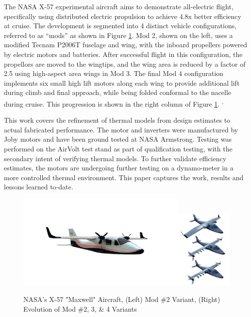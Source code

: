\documentclass[]{aiaa-tc}%
\begin{document}
The NASA X-57 experimental aircraft aims to demonstrate all-electric flight, specifically using distributed electric propulsion to achieve 4.8x better efficiency at cruise. The development is segmented into 4 distinct vehicle configurations, referred to as ``mods'' as shown in Figure \ref{fig:Mod2Big}. Mod 2, shown on the left, uses a modified Tecnam P2006T fuselage and wing, with the inboard propellers powered by electric motors and batteries. After successful flight in this configuration, the propellors are moved to the wingtips, and the wing area is reduced by a factor of 2.5 using high-aspect area wings in Mod 3. The final Mod 4 configuration implements six small high lift motors along each wing to provide additional lift during climb and final approach, while being folded conformal to the nacelle during cruise. This progression is shown in the right column of Figure \ref{fig:Mod2Big}. \cite{falck_X57}\textsuperscript{,}\cite{Borer_2016}

This work covers the refinement of thermal models from design estimates to actual fabricated performance. The motor and inverters were manufactured by Joby motors and have been ground tested at NASA Armstrong. Testing was performed on the AirVolt test stand as part of qualification testing, with the secondary intent of verifying thermal models. To further validate efficiency estimates, the motors are undergoing further testing on a dynamo-meter in a more controlled thermal environment. This paper captures the work, results and lessons learned to-date.

\begin{figure}[!htb]%
	\centering
	\includegraphics[width=0.75\textwidth]{figures/X57_mod2.png}\includegraphics[width=0.25\textwidth]{figures/Mod234.png}
	\caption{NASA's X-57 "Maxwell" Aircraft, (Left) Mod \#2 Variant, (Right) Evolution of Mod \#2, 3, \& 4 Variants}
	\label{fig:Mod2Big}
\end{figure}
\end{document}
